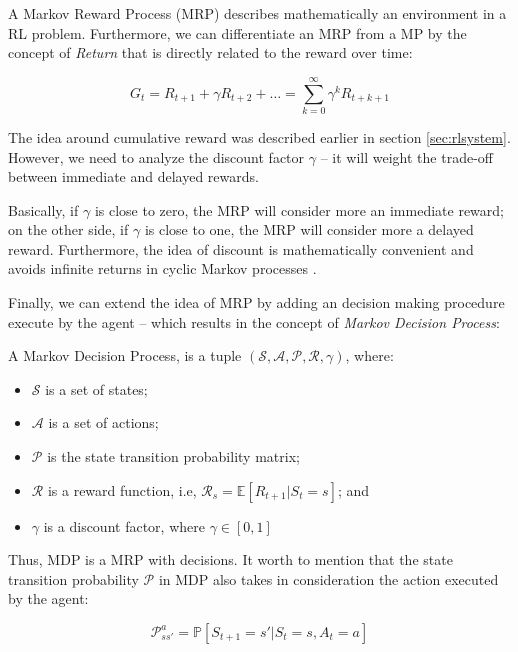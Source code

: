 A Markov Reward Process (MRP) describes mathematically an environment in a RL problem. Furthermore, we can differentiate an MRP from a MP by the concept of \textit{Return} that is directly related to the reward over time:

\begin{equation}
G_{t} = R_{t+1} + \gamma R_{t + 2} + \dots = \sum_{k = 0}^{\infty} \gamma^{k} R_{t + k + 1}
\end{equation}

The idea around cumulative reward was described earlier in section \ref{sec:rlsystem}. However, we need to analyze the discount factor $\gamma$ -- it will weight the trade-off between immediate and delayed rewards. 

Basically, if $\gamma$ is close to zero, the MRP will consider more an immediate reward; on the other side, if $\gamma$ is close to one, the MRP will consider more a delayed reward. Furthermore, the idea of discount is mathematically convenient and avoids infinite returns in cyclic Markov processes \cite{davidsilverlec2}.

Finally, we can extend the idea of MRP by adding an decision making procedure execute by the agent -- which results in the concept of \textit{Markov Decision Process}:

\begin{definition}
		A Markov Decision Process, is a tuple $(\mathcal{S}, \mathcal{A}, \mathcal{P}, \mathcal{R}, \gamma)$, where:
	\begin{itemize}
		\item $\mathcal{S}$ is a set of states; 
		\item $\mathcal{A}$ is a set of actions; 
		\item $\mathcal{P}$ is the state transition probability matrix;
		\item $\mathcal{R}$ is a reward function, i.e, $\mathcal{R}_{s} = \mathbb{E}[R_{t+1} | S_{t} = s]$; and
		\item $\gamma$ is a discount factor, where $\gamma \in [0,1]$
	\end{itemize}
\end{definition}

Thus, MDP is a MRP with decisions. It worth to mention that the state transition probability $\mathcal{P}$ in MDP also takes in consideration the action executed by the agent:

\begin{equation}
\mathcal{P}_{ss'}^{a} = \mathbb{P}[S_{t+1} = s' | S_{t} = s, A_{t} = a]
\end{equation}

